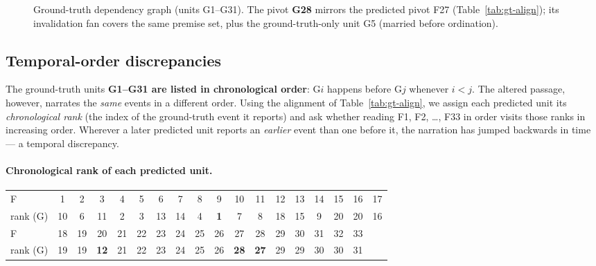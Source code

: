 \documentclass[11pt]{article}
\begin{document}
\begin{figure}[h]
\caption{Ground-truth dependency graph (units G1--G31). The pivot \textbf{G28}
mirrors the predicted pivot F27 (Table~\ref{tab:gt-align}); its invalidation fan
covers the same premise set, plus the ground-truth-only unit G5 (married before
ordination).}
\label{fig:gt-graph}
\end{figure}

\subsection*{Temporal-order discrepancies}

The ground-truth units \textbf{G1--G31 are listed in chronological order}: G$i$
happens before G$j$ whenever $i<j$. The altered passage, however, narrates the
\emph{same} events in a different order. Using the alignment of
Table~\ref{tab:gt-align}, we assign each predicted unit its
\emph{chronological rank} (the index of the ground-truth event it reports) and
ask whether reading F1, F2, \dots, F33 in order visits those ranks in increasing
order. Wherever a later predicted unit reports an \emph{earlier} event than one
before it, the narration has jumped backwards in time --- a temporal
discrepancy.

\paragraph{Chronological rank of each predicted unit.}
\begin{center}\small
\begin{tabular}{l*{17}{c}}
\hline
F  & 1&2&3&4&5&6&7&8&9&10&11&12&13&14&15&16&17\\
rank (G) & 10&6&11&2&3&13&14&4&\textbf{1}&7&8&18&15&9&20&20&16\\
\hline
F  & 18&19&20&21&22&23&24&25&26&27&28&29&30&31&32&33&\\
rank (G) & 19&19&\textbf{12}&21&22&23&24&25&26&\textbf{28}&\textbf{27}&29&29&30&30&31&\\
\hline
\end{tabular}
\end{center}
\end{document}

